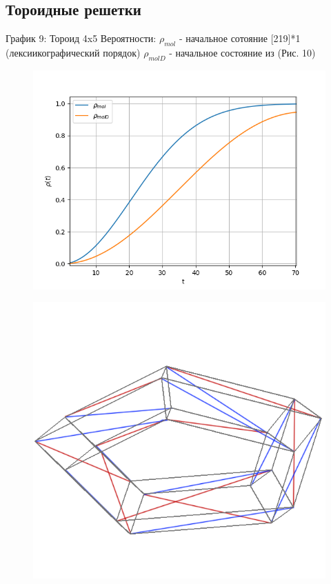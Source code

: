 \documentclass[12pt, a4paper]{article}
\begin{document}
\subsection{Тороидные решетки}
График 9:\newline
Тороид 4x5\newline
Вероятности:\newline
$\rho_{mol}$ - начальное сотояние [219]*1 (лексиикографический порядок)
\newline
$\rho_{molD}$ - начальное состояние из (Рис. 10)\newline
\begin{figure}[htp]
\centering
\includegraphics[scale=0.65]{Figure_6.png}
\caption{}
\label{}
\end{figure}
\begin{figure}[htp]
	\centering
	\includegraphics[scale=0.35]{Tor_4_5.png}
	\caption{}
	\label{}
\end{figure}
\newpage
\end{document}
